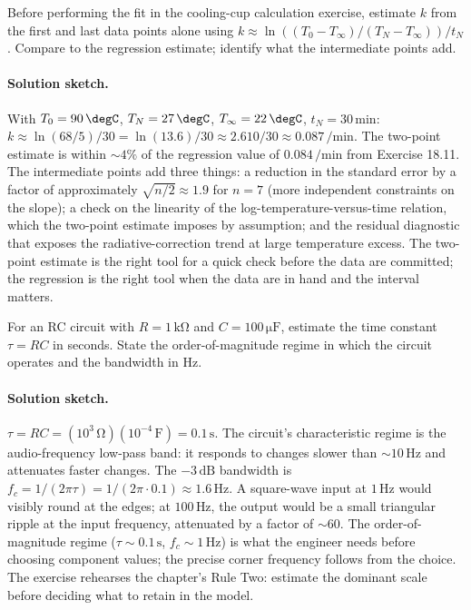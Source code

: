\begin{exercise}
Before performing the fit in the cooling-cup calculation
exercise, estimate $k$ from the first and last data points
alone using $k \approx \ln((T_{0}-T_{\infty})/(T_{N}-T_{\infty})) / t_{N}$.
Compare to the regression estimate; identify what the
intermediate points add.

\paragraph{Solution sketch.} With $T_{0} = 90\,\degC$, $T_{N} =
27\,\degC$, $T_{\infty} = 22\,\degC$, $t_{N} = 30\,\text{min}$:
$k \approx \ln(68/5)/30 = \ln(13.6)/30 \approx 2.610/30 \approx
0.087\,\si{\per\minute}$. The two-point estimate is within $\sim
4\%$ of the regression value of $0.084\,\si{\per\minute}$ from
Exercise 18.11. The intermediate points add three things: a
reduction in the standard error by a factor of approximately
$\sqrt{n/2} \approx 1.9$ for $n = 7$ (more independent constraints
on the slope); a check on the linearity of the
log-temperature-versus-time relation, which the two-point estimate
imposes by assumption; and the residual diagnostic that exposes
the radiative-correction trend at large temperature excess. The
two-point estimate is the right tool for a quick check before the
data are committed; the regression is the right tool when the
data are in hand and the interval matters.
\end{exercise}

\begin{exercise}
For an RC circuit with $R = 1\,\si{\kilo\ohm}$ and $C = 100\,\si{\micro\farad}$,
estimate the time constant $\tau = RC$ in seconds. State the
order-of-magnitude regime in which the circuit operates and
the bandwidth in Hz.

\paragraph{Solution sketch.} $\tau = RC = (10^{3}\,\si{\ohm})
(10^{-4}\,\si{\farad}) = 0.1\,\si{\second}$. The circuit's
characteristic regime is the audio-frequency low-pass band: it
responds to changes slower than $\sim 10\,\text{Hz}$ and attenuates
faster changes. The $-3\,\text{dB}$ bandwidth is
$f_{c} = 1/(2\pi\tau) = 1/(2\pi \cdot 0.1) \approx 1.6\,\text{Hz}$.
A square-wave input at $1\,\text{Hz}$ would visibly round at the
edges; at $100\,\text{Hz}$, the output would be a small triangular
ripple at the input frequency, attenuated by a factor of
$\sim 60$. The order-of-magnitude regime ($\tau \sim 0.1\,\text{s}$,
$f_{c} \sim 1\,\text{Hz}$) is what the engineer needs before
choosing component values; the precise corner frequency follows
from the choice. The exercise rehearses the chapter's Rule Two:
estimate the dominant scale before deciding what to retain in the
model.
\end{exercise}

